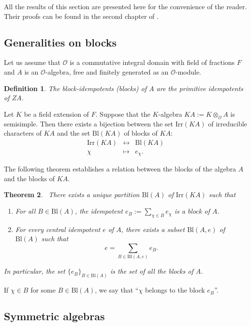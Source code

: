 \documentclass[10pt,a4paper,titlepage]{article}
\newtheorem{theorem}{Theorem}[section]
\newtheorem{definition}[theorem]{Definition}
\begin{document}
All the results of this section are presented here for the convenience of the reader.
Their proofs can be found in the second chapter of \cite{Chlou}.

\subsection {Generalities on blocks}

Let us assume that
$\mathcal{O}$ is a commutative integral domain with field of fractions
  $F$ and  $A$ is an $\mathcal{O}$-algebra, free and finitely generated as an
  $\mathcal{O}$-module.

\begin{definition}\label{blocks}
The block-idempotents (blocks) of $A$ are the primitive idempotents
of $ZA$.
\end{definition}

Let $K$ be a field extension of $F$. Suppose that the $K$-algebra $KA:=K \otimes_\mathcal{O}A$ is
semisimple. Then there exists a bijection between the set $\mathrm{Irr}(KA)$  of irreducible characters of  $KA$ and the set $\mathrm{Bl}(KA)$ of blocks of $KA$:
$$\begin{array}{ccc}
   \mathrm{Irr}(KA) & \leftrightarrow & \mathrm{Bl}(KA) \\
    \chi &\mapsto &e_\chi.
  \end{array}$$

The following theorem establishes a relation between the blocks of the algebra $A$ and the blocks of $KA$.

\begin{theorem}\label{minimality of blocks}\
There exists a unique partition $\mathrm{Bl}(A)$ of
  $\mathrm{Irr}(KA)$ such that
  \begin{enumerate}[(1)]
    \item For all $B \in \mathrm{Bl}(A)$, the idempotent
    $e_B:=\sum_{\chi \in B}e_\chi$ is a block of $A$.
    \item For
    every central idempotent $e$ of $A$, there exists a subset
    $\mathrm{Bl}(A,e)$ of $\mathrm{Bl}(A)$ such that
    $$e=\sum_{B \in \mathrm{Bl}(A,e)}e_B.$$
      \end{enumerate}
    In particular, the set $\{e_B\}_{B \in \mathrm{Bl}(A)}$ is the set of all the blocks of $A$.
\end{theorem}
If $\chi \in B$ for some $B \in \mathrm{Bl}(A)$, we say that
  ``$\chi$ belongs to the block $e_B$''.

\subsection {Symmetric algebras}
\end{document}
